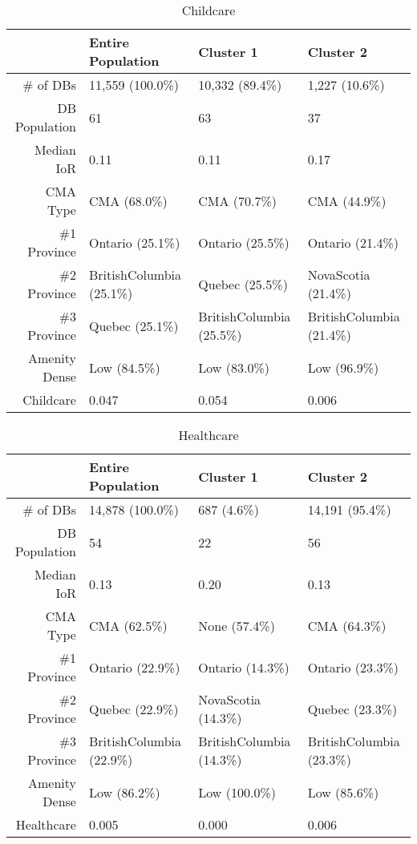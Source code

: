 \documentclass[11pt, a4paper]{article}
\begin{document}
 \pagebreak 
 
\begin{sidewaystable}[ht]
\centering
\begin{tabular}{rlll}
  \hline
 & Entire Population & Cluster 1 & Cluster 2 \\ 
  \hline
\# of DBs & 11,559 (100.0\%) & 10,332 (89.4\%) & 1,227 (10.6\%) \\ 
  DB Population & 61 & 63 & 37 \\ 
  Median IoR & 0.11 & 0.11 & 0.17 \\ 
  CMA Type & CMA (68.0\%) & CMA (70.7\%) & CMA (44.9\%) \\ 
  \#1 Province & Ontario (25.1\%) & Ontario (25.5\%) & Ontario (21.4\%) \\ 
  \#2 Province & BritishColumbia (25.1\%) & Quebec (25.5\%) & NovaScotia (21.4\%) \\ 
  \#3 Province & Quebec (25.1\%) & BritishColumbia (25.5\%) & BritishColumbia (21.4\%) \\ 
  Amenity Dense & Low (84.5\%) & Low (83.0\%) & Low (96.9\%) \\ 
  Childcare & 0.047 & 0.054 & 0.006 \\ 
   \hline
\end{tabular}
\caption{Childcare} 
\end{sidewaystable}





 \pagebreak 
 
\begin{sidewaystable}[ht]
\centering
\begin{tabular}{rlll}
  \hline
 & Entire Population & Cluster 1 & Cluster 2 \\ 
  \hline
\# of DBs & 14,878 (100.0\%) & 687 (4.6\%) & 14,191 (95.4\%) \\ 
  DB Population & 54 & 22 & 56 \\ 
  Median IoR & 0.13 & 0.20 & 0.13 \\ 
  CMA Type & CMA (62.5\%) & None (57.4\%) & CMA (64.3\%) \\ 
  \#1 Province & Ontario (22.9\%) & Ontario (14.3\%) & Ontario (23.3\%) \\ 
  \#2 Province & Quebec (22.9\%) & NovaScotia (14.3\%) & Quebec (23.3\%) \\ 
  \#3 Province & BritishColumbia (22.9\%) & BritishColumbia (14.3\%) & BritishColumbia (23.3\%) \\ 
  Amenity Dense & Low (86.2\%) & Low (100.0\%) & Low (85.6\%) \\ 
  Healthcare & 0.005 & 0.000 & 0.006 \\ 
   \hline
\end{tabular}
\caption{Healthcare} 
\end{sidewaystable}
\end{document}
